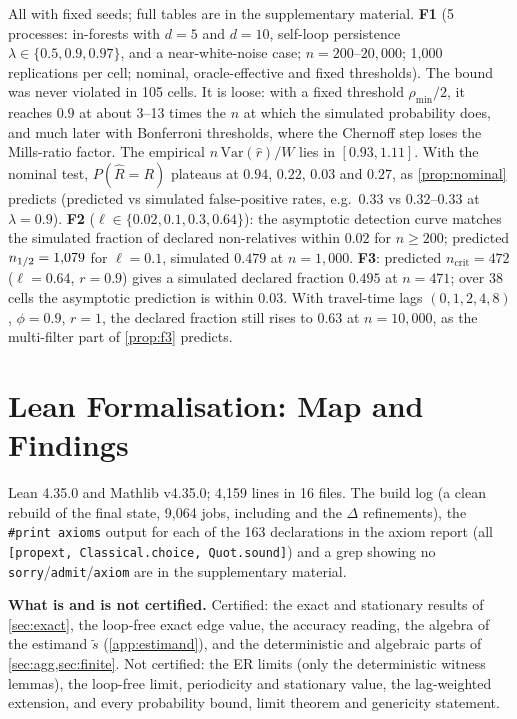 All with fixed seeds; full tables are in the supplementary material.
\textbf{F1} (5 processes: in-forests with $d=5$ and $d=10$, self-loop
persistence $\lambda\in\{0.5,0.9,0.97\}$, and a near-white-noise case;
$n=200$--$20{,}000$; 1{,}000 replications per cell; nominal, oracle-effective
and fixed thresholds). The bound was never violated in 105 cells. It is loose:
with a fixed threshold $\rho_{\min}/2$, it reaches $0.9$ at about 3--13 times
the $n$ at which the simulated probability does, and much later with
Bonferroni thresholds, where the Chernoff step loses the Mills-ratio factor.
The empirical $n\,\mathrm{Var}(\hat r)/W$ lies in $[0.93,1.11]$. With the
nominal test, $P(\hat R=R)$ plateaus at $0.94$, $0.22$, $0.03$ and $0.27$, as
\cref{prop:nominal} predicts (predicted vs simulated false-positive rates,
e.g.\ $0.33$ vs $0.32$--$0.33$ at $\lambda=0.9$).
\textbf{F2} ($\ell\in\{0.02,0.1,0.3,0.64\}$): the asymptotic detection curve
matches the simulated fraction of declared non-relatives within $0.02$ for
$n\ge200$; predicted $n_{1/2}=1{,}079$ for $\ell=0.1$, simulated $0.479$ at
$n=1{,}000$.
\textbf{F3}: predicted $n_{\mathrm{crit}}=472$ ($\ell=0.64$, $r=0.9$) gives a
simulated declared fraction $0.495$ at $n=471$; over 38 cells the asymptotic
prediction is within $0.03$. With travel-time lags $(0,1,2,4,8)$, $\phi=0.9$,
$r=1$, the declared fraction still rises to $0.63$ at $n=10{,}000$, as the
multi-filter part of \cref{prop:f3} predicts.

\section{Lean Formalisation: Map and Findings}
\label{app:lean}

Lean 4.35.0 and Mathlib v4.35.0; 4{,}159 lines in 16 files. The build log
(a clean rebuild of the final state, 9{,}064 jobs, including 
and the $\Delta$ refinements),
the \texttt{\#print axioms} output for each of the 163 declarations in the axiom
report (all \texttt{[propext, Classical.choice, Quot.sound]}) and a grep showing
no \texttt{sorry}/\texttt{admit}/\texttt{axiom} are in the supplementary
material.

\textbf{What is and is not certified.} Certified: the exact and stationary
results of \cref{sec:exact}, the loop-free exact edge value, the accuracy
reading, the algebra of the estimand $\tilde s$ (\cref{app:estimand}), and the
deterministic and algebraic parts of \cref{sec:agg,sec:finite}. Not certified:
the ER limits (only the deterministic witness lemmas), the loop-free limit,
periodicity and stationary value, the lag-weighted extension, and every
probability bound, limit theorem and genericity statement.

